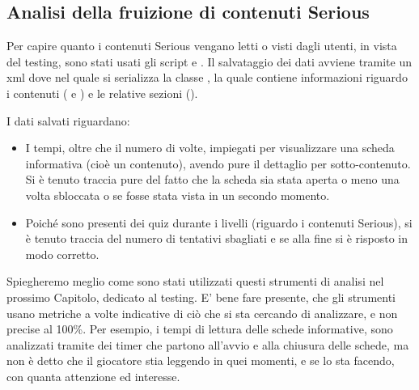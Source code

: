 \subsection{Analisi della fruizione di contenuti Serious}
\label{analisiFruizione}

Per capire quanto i contenuti Serious vengano letti o visti dagli utenti, in vista del testing, sono stati usati gli script  e . Il salvataggio dei dati avviene tramite un xml dove nel quale si serializza la classe , la quale contiene informazioni riguardo i contenuti ( e ) e le relative sezioni ().

I dati salvati riguardano:

\begin{itemize}

\item I tempi, oltre che il numero di volte, impiegati per visualizzare una scheda informativa (cioè un contenuto), avendo pure il dettaglio per sotto-contenuto. Si è tenuto traccia pure del fatto che la scheda sia stata aperta o meno una volta sbloccata o se fosse stata vista in un secondo momento.
\item Poiché sono presenti dei quiz durante i livelli (riguardo i contenuti Serious), si è tenuto traccia del numero di tentativi sbagliati e se alla fine si è risposto in modo corretto.

\end{itemize}

Spiegheremo meglio come sono stati utilizzati questi strumenti di analisi nel prossimo Capitolo, dedicato al testing. E' bene fare presente, che gli strumenti usano metriche a volte indicative di ciò che si sta cercando di analizzare, e non precise al 100\%. Per esempio, i tempi di lettura delle schede informative, sono analizzati tramite dei timer che partono all'avvio e alla chiusura delle schede, ma non è detto che il giocatore stia leggendo in quei momenti, e se lo sta facendo, con quanta attenzione ed interesse.

\newpage
